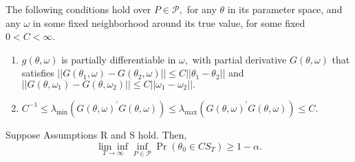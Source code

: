 \documentclass[smaller, aspectratio=169]{beamer}
\begin{document}
\begin{frame}
The following conditions hold over $P\in \mathcal{P}, $ for any $\theta $ in its parameter space, and any $\omega $ in some fixed neighborhood around its true value, for some fixed $0<C<\infty$.
%
\begin{enumerate}
  \item $g(\theta, \omega )$ is partially differentiable in $\omega, $ with partial derivative $G(\theta, \omega )$ that satisfies $||G(\theta _{1}, \omega )-G(\theta _{2}, \omega )||\leq C||\theta _{1}-\theta _{2}||$ and $||G(\theta, \omega _{1})-G(\theta, \omega _{2})||\leq C||\omega _{1}-\omega _{2}||.$
%
  \item $C^{-1}\leq \lambda_{\min}(G(\theta, \omega )^{\prime}G(\theta, \omega ))\leq \lambda_{\max}(G(\theta, \omega )^{\prime}G(\theta, \omega ))\leq C$.
\end{enumerate}

\begin{theorem}
  \label{Lemma CS}
  Suppose Assumptions R and S hold. Then, 
%
  \begin{equation*} 
    \underset{T\rightarrow \infty}{\lim \inf}\underset{P\in \mathcal{P}}{\inf}\Pr \left( \theta _{0}\in CS_{T}\right) \geq 1-\alpha .
  \end{equation*}
\end{theorem}

\end{frame}
\end{document}
